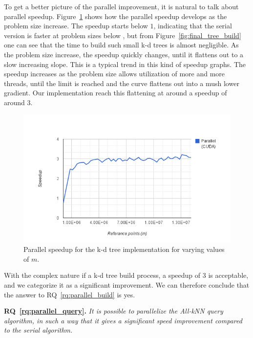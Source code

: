 To get a better picture of the parallel improvement, it is natural to talk about parallel speedup. Figure~\ref{fig:final_tree_build_speedup} shows how the parallel speedup develops as the problem size increase. The speedup starts below $1$, indicating that the serial version is faster at problem sizes below , but from Figure~\ref{fig:final_tree_build} one can see that the time to build such small k-d trees is almost negligible. As the problem size increase, the speedup quickly changes, until it flattens out to a slow increasing slope. This is a typical trend in this kind of speedup graphs. The speedup increases as the problem size allows utilization of more and more threads, until the limit is reached and the curve flattens out into a mush lower gradient. Our implementation reach this flattening at around a speedup of around $3$.      

\begin{figure}[ht!]
    \centering
    \includegraphics[width=120mm]{../gfx/final_tree_build_speedup.png}
    \caption{Parallel speedup for the k-d tree implementation for varying values of $m$.}
    \label{fig:final_tree_build_speedup}
\end{figure}

With the complex nature if a k-d tree build process, a speedup of $3$ is acceptable, and we categorize it as a significant improvement. We can therefore conclude that the answer to RQ~\ref{rq:parallel_build} is yes. 




\textbf{RQ~\ref{rq:parallel_query}.} \emph{It is possible to parallelize the All-kNN query algorithm, in such a way that it gives a significant speed improvement compared to the serial algorithm.}


